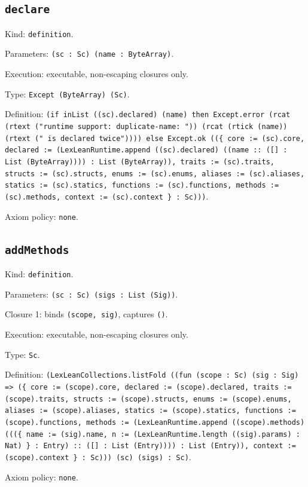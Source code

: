 \documentclass[11pt]{article}
\begin{document}
\subsection*{\texttt{declare}}
\noindent Kind: \texttt{definition}.\par
\noindent Parameters: \texttt{(sc : Sc) (name : ByteArray)}.\par
\noindent Execution: executable, non-escaping closures only.\par
\noindent Type: \texttt{Except (ByteArray) (Sc)}.\par
\noindent Definition: \texttt{(if inList ((sc).declared) (name) then Except.error (rcat (rtext ("runtime support: duplicate-name: ")) (rcat (rtick (name)) (rtext (" is declared twice")))) else Except.ok ((\{ core := (sc).core, declared := (LexLeanRuntime.append ((sc).declared) ((name :: ([] : List (ByteArray)))) : List (ByteArray)), traits := (sc).traits, structs := (sc).structs, enums := (sc).enums, aliases := (sc).aliases, statics := (sc).statics, functions := (sc).functions, methods := (sc).methods, context := (sc).context \} : Sc)))}.\par
\noindent Axiom policy: \texttt{none}.\par
\subsection*{\texttt{addMethods}}
\noindent Kind: \texttt{definition}.\par
\noindent Parameters: \texttt{(sc : Sc) (sigs : List (Sig))}.\par
\noindent Closure 1: binds \texttt{(scope, sig)}, captures \texttt{()}.\par
\noindent Execution: executable, non-escaping closures only.\par
\noindent Type: \texttt{Sc}.\par
\noindent Definition: \texttt{(LexLeanCollections.listFold ((fun (scope : Sc) (sig : Sig) => (\{ core := (scope).core, declared := (scope).declared, traits := (scope).traits, structs := (scope).structs, enums := (scope).enums, aliases := (scope).aliases, statics := (scope).statics, functions := (scope).functions, methods := (LexLeanRuntime.append ((scope).methods) (((\{ name := (sig).name, n := (LexLeanRuntime.length ((sig).params) : Nat) \} : Entry) :: ([] : List (Entry)))) : List (Entry)), context := (scope).context \} : Sc))) (sc) (sigs) : Sc)}.\par
\noindent Axiom policy: \texttt{none}.\par
\end{document}
